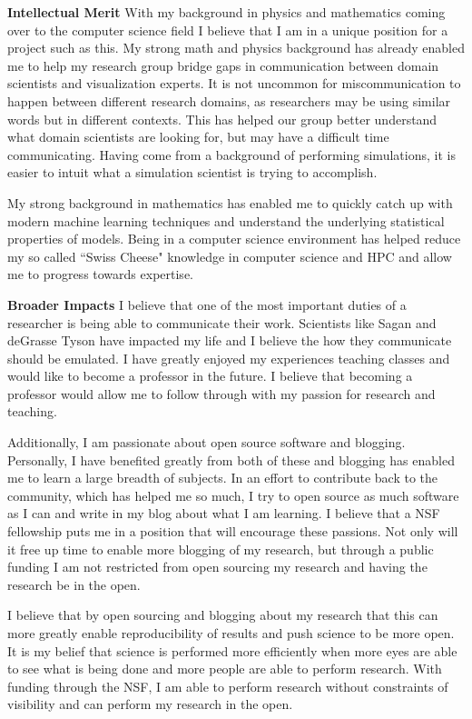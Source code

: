 \documentclass[12pt]{article}
\begin{document}
\textbf{Intellectual Merit}
%
With my background in physics and mathematics coming over to the computer
science field I believe that I am in a unique position for a project such as
this. My strong math and physics background has already enabled me to help my
research group bridge gaps in communication between domain scientists and
visualization experts. It is not uncommon for miscommunication to happen between
different research domains, as researchers may be using similar words but in
different contexts. This has helped our group better understand what domain
scientists are looking for, but may have a difficult time communicating. Having
come from a background of performing simulations, it is easier to intuit what a
simulation scientist is trying to accomplish.

My strong background in mathematics has enabled me to quickly catch up with
modern machine learning techniques and understand the underlying statistical
properties of models. Being in a computer science environment has helped reduce
my so called ``Swiss Cheese" knowledge in computer science and HPC and allow me 
to progress towards expertise. 

\textbf{Broader Impacts}
%
I believe that one of the most important duties of a researcher is being able to
communicate their work. Scientists like Sagan and deGrasse Tyson have impacted
my life and I believe the how they communicate should be emulated. I have
greatly enjoyed my experiences teaching classes and would like to become a
professor in the future. I believe that becoming a professor would allow me to
follow through with my passion for research and teaching. 

Additionally, I am passionate about open source software and blogging.
Personally, I have benefited greatly from both of these and blogging has enabled
me to learn a large breadth of subjects. In an effort to contribute back to the
community, which has helped me so much, I try to open source as much software as
I can and write in my blog about what I am learning. I believe that a NSF
fellowship puts me in a position that will encourage these passions. Not only
will it free up time to enable more blogging of my research, but through a
public funding I am not restricted from open sourcing my research and having the
research be in the open.

I believe that by open sourcing and blogging about my research that this can
more greatly enable reproducibility of results and push science to be more open.
It is my belief that science is performed more efficiently when more eyes are
able to see what is being done and more people are able to perform research.
With funding through the NSF, I am able to perform research without constraints
of visibility and can perform my research in the open.
\end{document}
